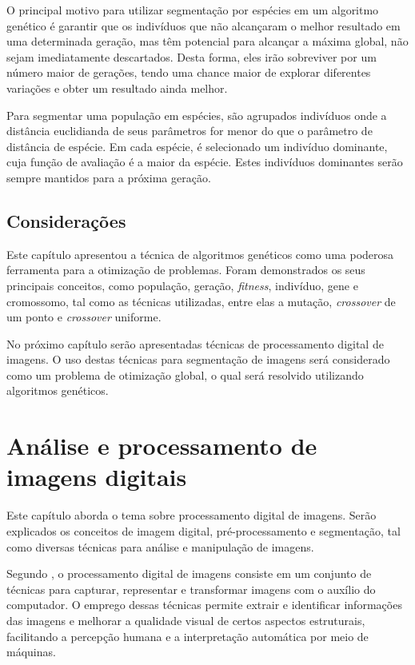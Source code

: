 \documentclass[12pt,oneside,a4paper,english,french,spanish,brazil,]{abntex2}
\begin{document}
O principal motivo para utilizar segmentação por espécies em um algoritmo genético é garantir que os indivíduos que não alcançaram o melhor resultado em uma determinada geração, mas têm potencial para alcançar a máxima global, não sejam imediatamente descartados. Desta forma, eles irão sobreviver por um número maior de gerações, tendo uma chance maior de explorar diferentes variações e obter um resultado ainda melhor.

Para segmentar uma população em espécies, são agrupados indivíduos onde a distância euclidianda de seus parâmetros for menor do que o parâmetro de distância de espécie. Em cada espécie, é selecionado um indivíduo dominante, cuja função de avaliação é a maior da espécie. Estes indivíduos dominantes serão sempre mantidos para a próxima geração.

\section{Considerações}

Este capítulo apresentou a técnica de algoritmos genéticos como uma poderosa ferramenta para a otimização de problemas. Foram demonstrados os seus principais conceitos, como população, geração, \textit{fitness}, indivíduo, gene e cromossomo, tal como as técnicas utilizadas, entre elas a mutação, \textit{crossover} de um ponto e \textit{crossover} uniforme.

No próximo capítulo serão apresentadas técnicas de processamento digital de imagens. O uso destas técnicas para segmentação de imagens será considerado como um problema de otimização global, o qual será resolvido utilizando algoritmos genéticos.


\chapter{Análise e processamento de imagens digitais}
\label{chap:PDI}

Este capítulo aborda o tema sobre processamento digital de imagens. Serão explicados os conceitos de imagem digital, pré-processamento e segmentação, tal como diversas técnicas para análise e manipulação de imagens.

Segundo \citet{pedrini:2008}, o processamento digital de imagens consiste em um conjunto de técnicas para capturar, representar e transformar imagens com o auxílio do computador. O emprego dessas técnicas permite extrair e identificar informações das imagens e melhorar a qualidade visual de certos aspectos estruturais, facilitando a percepção humana e a interpretação automática por meio de máquinas. 
\end{document}
